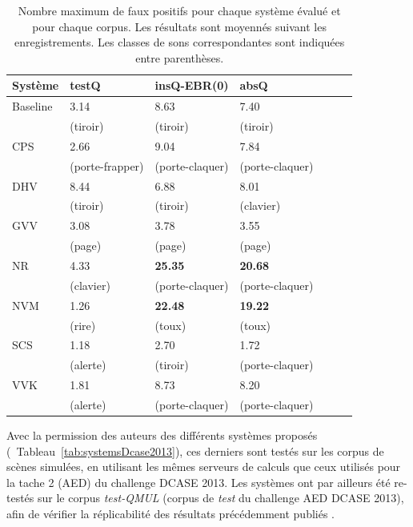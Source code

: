 \begin{table}
\begin{center} 
\begin{tabular}{lllllll}  
  Système &   testQ         &  insQ-EBR(0)      &   absQ          \\
 \hline
 Baseline & 3.14            &  8.63             &  7.40    \\
          & (tiroir)        &  (tiroir)         & (tiroir) \\
      CPS & 2.66            &  9.04             &  7.84   \\
          & (porte-frapper) & (porte-claquer)   & (porte-claquer) \\
      DHV & 8.44            &  6.88             &  8.01  \\
          & (tiroir)        &  (tiroir)         &  (clavier)  \\
      GVV & 3.08            &  3.78             &  3.55   \\
          & (page)          &  (page)           & (page) \\
      NR  & 4.33            & \textbf{25.35}    & \textbf{20.68}  \\
          & (clavier)       & (porte-claquer)   & (porte-claquer)  \\
      NVM & 1.26            & \textbf{22.48}    & \textbf{19.22}    \\
          & (rire)          & (toux)            & (toux) \\
      SCS & 1.18            &  2.70             &  1.72   \\
          & (alerte)        &  (tiroir)         & (porte-claquer)  \\
      VVK & 1.81            &  8.73             &  8.20   \\ 
          & (alerte)        &  (porte-claquer)  & (porte-claquer) \\
       \hline
\end{tabular}
\end{center} 
\caption[Nombre maximum de faux positifs pour chaque système évalué et pour chaque corpus]{Nombre maximum de faux positifs pour chaque système évalué et pour chaque corpus. Les résultats sont moyennés suivant les enregistrements. Les classes de sons correspondantes sont indiquées entre parenthèses.}
\label{tab:fp}
\end{table}

Avec la permission des auteurs des différents systèmes proposés (\cf~Tableau~\ref{tab:systemsDcase2013}), ces derniers sont testés sur les corpus de scènes simulées, en utilisant les mêmes serveurs de calculs que ceux utilisés pour la tache 2 (AED) du challenge DCASE 2013. Les systèmes ont par ailleurs été re-testés sur le corpus \emph{test-QMUL} (corpus de \emph{test} du challenge AED DCASE 2013), afin de vérifier la réplicabilité des résultats précédemment publiés \citep{Stowell15}.

